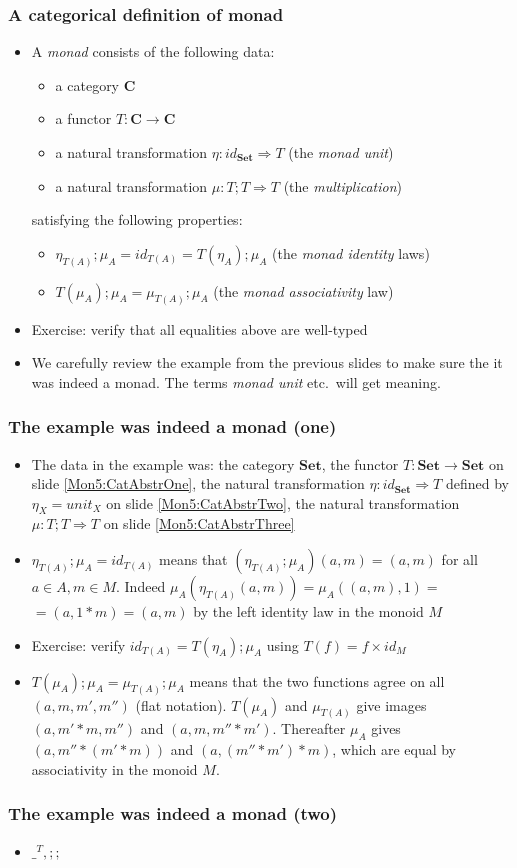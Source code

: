 \documentclass[handout]{beamer}
\newcommand{\To}{\Rightarrow}
\newcommand{\bfsf}[1]{{\boldsymbol{#1}}}
\newcommand{\Set}{\bfsf{Set}}
\newcommand{\CC}{\bfsf{C}}
\newcommand{\Kc}{;\!;}
\begin{document}
\frame
  {   
    \frametitle{A categorical definition of monad}\label{Mon5:CatDefMonad}

 \begin{itemize}[<+->]
\item A \emph{monad} consists of the following data:
 \begin{itemize}
    \item a category $\CC$
    \item a functor $T:\CC\to\CC$
    \item a natural transformation $\eta: id_\Set \To T$ (the \emph{monad unit})
    \item a natural transformation $\mu: T;T \To T$ (the \emph{multiplication})
 \end{itemize}
satisfying the following properties:
 \begin{itemize}
    \item $\eta_{T(A)};\mu_A = id_{T(A)} = T(\eta_A);\mu_A$ (the \emph{monad identity} laws)
    \item $T(\mu_A);\mu_A = \mu_{T(A)};\mu_A$ (the \emph{monad associativity} law)
 \end{itemize}
\item Exercise: verify that all equalities above are well-typed
\item We carefully review the example from the previous slides to 
make sure the it was indeed a monad. 
The terms \emph{monad unit} etc.\ will get meaning. 
 \end{itemize}

 }

\frame
  {   
    \frametitle{The example was indeed a monad (one)}\label{Mon5:ExaMonadOne}

 \begin{itemize}[<+->]
\item The data in the example was: the category $\Set$, 
the functor $T:\Set\to\Set$ on slide \ref{Mon5:CatAbstrOne}, 
the natural transformation $\eta: id_\Set\To T$
defined by $\eta_X = unit_X$ on slide \ref{Mon5:CatAbstrTwo}, 
the natural transformation $\mu: T;T \To T$
on slide \ref{Mon5:CatAbstrThree}
\item $\eta_{T(A)};\mu_A = id_{T(A)}$ means that  $(\eta_{T(A)};\mu_A)(a,m) = (a,m)$
for all $a\in A, m\in M$. Indeed $\mu_A(\eta_{T(A)}(a,m)) = \mu_A((a,m),1) =$ $= (a,1*m) = (a,m)$
by the left identity law in the monoid $M$
\item Exercise: verify  $id_{T(A)} = T(\eta_A);\mu_A$ using $T(f) = f\times id_M$
\item $T(\mu_A);\mu_A = \mu_{T(A)};\mu_A$ means that the two functions agree
on all $(a,m,m',m'')$ (flat notation). $T(\mu_A)$ and $\mu_{T(A)}$ give images $(a,m'*m,m'')$ and $(a,m,m''*m')$. Thereafter $\mu_A$ gives $(a,m''*(m'*m))$ and $(a,(m''*m')*m)$, which are equal by
associativity in the monoid $M$.
 \end{itemize}

 }

\frame
  {   
    \frametitle{The example was indeed a monad (two)}\label{Mon5:ExaMonadTwo}

 \begin{itemize}[<+->]
\item $\_^T, \Kc$
 \end{itemize}

 }
\end{document}

